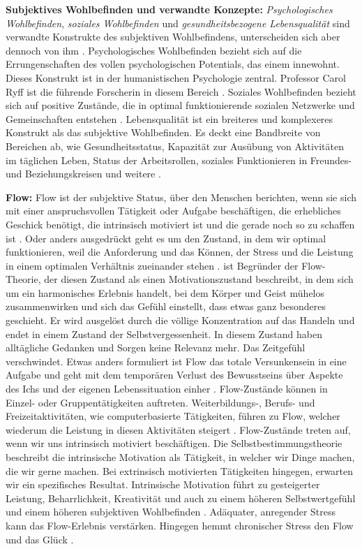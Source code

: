 \par
\textbf{Subjektives Wohlbefinden und verwandte Konzepte:} \textit{Psychologisches Wohlbefinden}, \textit{soziales Wohlbefinden} und \textit{gesundheitsbezogene Lebensqualität} sind verwandte Konstrukte des subjektiven Wohlbefindens, unterscheiden sich aber dennoch von ihm \cite{Carr2011}. Psychologisches Wohlbefinden bezieht sich auf die Errungenschaften des vollen psychologischen Potentials, das einem innewohnt. Dieses Konstrukt ist in der humanistischen Psychologie zentral. Professor Carol Ryff ist die führende Forscherin in diesem Bereich \cite{Ryff1989}. Soziales Wohlbefinden bezieht sich auf positive Zustände, die in optimal funktionierende sozialen Netzwerke und Gemeinschaften entstehen \cite{Keyes1998}. Lebensqualität ist ein breiteres und komplexeres Konstrukt als das subjektive Wohlbefinden. Es deckt eine Bandbreite von Bereichen ab, wie Gesundheitsstatus, Kapazität zur Ausübung von Aktivitäten im täglichen Leben, Status der Arbeitsrollen, soziales Funktionieren in Freundes- und Beziehungskreisen und weitere \cite{Preedy2010}. 
\par
\textbf{Flow:}
Flow ist der subjektive Status, über den Menschen berichten, wenn sie sich mit einer anspruchsvollen Tätigkeit oder Aufgabe beschäftigen, die erhebliches Geschick benötigt, die intrinsisch motiviert ist und die gerade noch so zu schaffen ist \cite{Nakamura2009}. Oder anders ausgedrückt geht es um den Zustand, in dem wir optimal funktionieren, weil die Anforderung und das Können, der Stress und die Leistung in einem optimalen Verhältnis zueinander stehen \cite{Esch2014}.  ist Begründer der Flow-Theorie, der diesen Zustand als einen Motivationszustand beschreibt, in dem sich um ein harmonisches Erlebnis handelt, bei dem Körper und Geist mühelos zusammenwirken und sich das Gefühl einstellt, dass etwas ganz besonderes geschieht. Er wird ausgelöst durch die völlige Konzentration auf das Handeln und endet in einem Zustand der Selbstvergessenheit. In diesem Zustand haben alltägliche Gedanken und Sorgen keine Relevanz mehr. Das Zeitgefühl verschwindet. Etwas anders formuliert ist Flow das totale Versunkensein in eine Aufgabe und geht mit dem temporären Verlust des Bewusstseins über Aspekte des Ichs und der eigenen Lebenssituation einher \cite{Nakamura2009}. Flow-Zustände können in Einzel- oder Gruppentätigkeiten auftreten. Weiterbildungs-, Berufs- und Freizeitaktivitäten, wie computerbasierte Tätigkeiten, führen zu Flow, welcher wiederum die Leistung in diesen Aktivitäten steigert \cite{Carr2011}. Flow-Zustände treten auf, wenn wir uns intrinsisch motiviert beschäftigen. Die Selbstbestimmungstheorie beschreibt die intrinsische Motivation als Tätigkeit, in welcher wir Dinge machen, die wir gerne machen. Bei extrinsisch motivierten Tätigkeiten hingegen, erwarten wir ein spezifisches Resultat. Intrinsische Motivation führt zu gesteigerter Leistung, Beharrlichkeit, Kreativität und auch zu einem höheren Selbstwertgefühl und einem höheren subjektiven Wohlbefinden \cite{Deci1985}. Adäquater, anregender Stress kann das Flow-Erlebnis verstärken. Hingegen hemmt chronischer Stress den Flow und das Glück \cite{Esch2014}.

